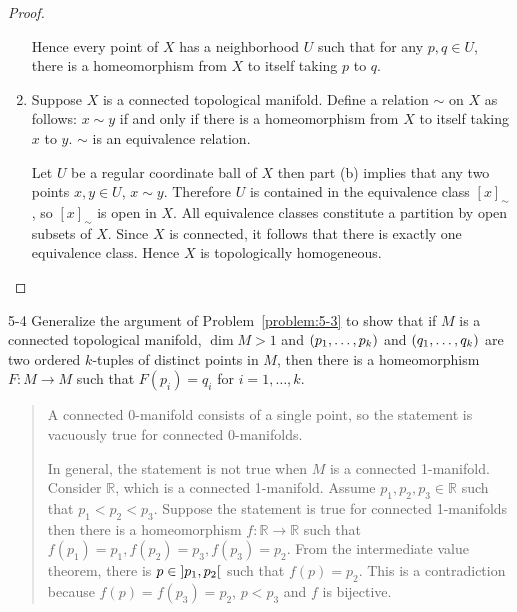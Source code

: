 \begin{proof}
\begin{enumerate}[label={(\alph*)}]
		      Hence every point of $X$ has a neighborhood $U$ such that for any $p, q \in U$, there is a homeomorphism from $X$ to itself taking $p$ to $q$.
		\item Suppose $X$ is a connected topological manifold. Define a relation $\sim$ on $X$ as follows: $x \sim y$ if and only if there is a homeomorphism from $X$ to itself taking $x$ to $y$. $\sim$ is an equivalence relation.

		      Let $U$ be a regular coordinate ball of $X$ then part (b) implies that any two points $x, y\in U$, $x \sim y$. Therefore $U$ is contained in the equivalence class ${[x]}_{\sim}$, so ${[x]}_{\sim}$ is open in $X$. All equivalence classes constitute a partition by open subsets of $X$. Since $X$ is connected, it follows that there is exactly one equivalence class. Hence $X$ is topologically homogeneous.
	\end{enumerate}
\end{proof}

\begin{problem}{5-4}\label{problem:5-4}
Generalize the argument of Problem~\ref{problem:5-3} to show that if $M$ is a connected topological manifold, $\dim M > 1$ and $\left({p_{1}, \ldots, p_{k}}\right)$ and $\left({q_{1}, \ldots, q_{k}}\right)$ are two ordered $k$-tuples of distinct points in $M$, then there is a homeomorphism $F: M \to M$ such that $F(p_{i}) = q_{i}$ for $i = 1, \ldots, k$.
\end{problem}

\begin{quote}
	A connected 0-manifold consists of a single point, so the statement is vacuously true for connected 0-manifolds.

	In general, the statement is not true when $M$ is a connected 1-manifold. Consider $\mathbb{R}$, which is a connected 1-manifold. Assume $p_{1}, p_{2}, p_{3}\in \mathbb{R}$ such that $p_{1} < p_{2} < p_{3}$. Suppose the statement is true for connected 1-manifolds then there is a homeomorphism $f: \mathbb{R} \to \mathbb{R}$ such that $f(p_{1}) = p_{1}, f(p_{2}) = p_{3}, f(p_{3}) = p_{2}$. From the intermediate value theorem, there is $p \in \left]{p_{1}, p_{2}}\right[$ such that $f(p) = p_{2}$. This is a contradiction because $f(p) = f(p_{3}) = p_{2}$, $p < p_{3}$ and $f$ is bijective.
\end{quote}

